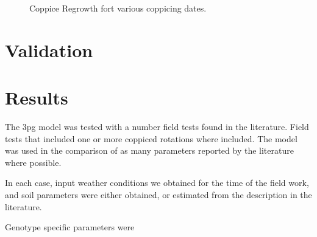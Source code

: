 \documentclass[10pt]{article}
\begin{document}
\begin{figure}
  \caption{Coppice Regrowth fort various coppicing dates.}
  \label{fig:test}
\end{figure}

\section*{Validation}

\section*{Results}

The \ac{3pg} model was tested with a number field tests found in the
literature.  Field tests that included one or more coppiced rotations
where included.  The model was used in the comparison of as many
parameters reported by the literature where possible.  

In each case, input weather conditions we obtained for the time of the
field work, and soil parameters were either obtained, or estimated
from the description in the literature.  

Genotype specific parameters were
\end{document}
